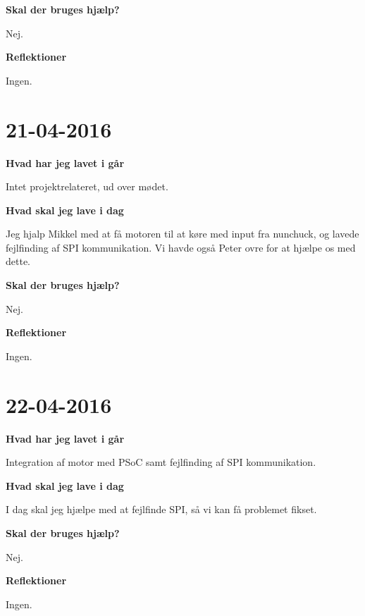 \documentclass{article}
\begin{document}
	\textbf{Skal der bruges hjælp?}
	
	Nej.
	
	\textbf{Reflektioner}
	
	Ingen.
	
	\section{21-04-2016}
	\textbf{Hvad har jeg lavet i går}
	
	Intet projektrelateret, ud over mødet.
	
	\textbf{Hvad skal jeg lave i dag}
	
	Jeg hjalp Mikkel med at få motoren til at køre med input fra nunchuck, og lavede fejlfinding af SPI kommunikation. Vi havde også Peter ovre for at hjælpe os med dette.
	
	\textbf{Skal der bruges hjælp?}
	
	Nej.
	
	\textbf{Reflektioner}
	
	Ingen.
	
	\section{22-04-2016}
	\textbf{Hvad har jeg lavet i går}
	
	Integration af motor med PSoC samt fejlfinding af SPI kommunikation.
	
	\textbf{Hvad skal jeg lave i dag}
	
	I dag skal jeg hjælpe med at fejlfinde SPI, så vi kan få problemet fikset.
	
	\textbf{Skal der bruges hjælp?}
	
	Nej.
	
	\textbf{Reflektioner}
	
	Ingen.
\end{document}
